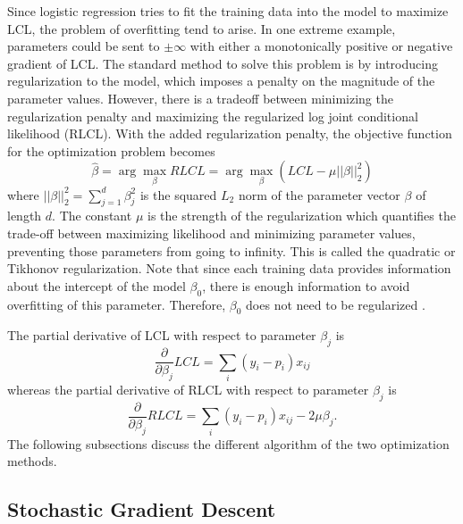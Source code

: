 \documentclass{article} %
\newcommand{\argmax}{\arg\!\max}
\begin{document}
Since logistic regression tries to fit the training data into the model to maximize LCL, the problem of overfitting tend to arise.
In one extreme example, parameters could be sent to $\pm \infty$ with either a monotonically positive or negative gradient of LCL\@.
The standard method to solve this problem is by introducing regularization to the model, which imposes a penalty on the magnitude of the parameter values.
However, there is a tradeoff between minimizing the regularization penalty and maximizing the regularized log joint conditional likelihood (RLCL).
With the added regularization penalty, the objective function for the optimization problem becomes
\begin{equation} \label{eq:objfun_reg}
\hat{\beta} = \argmax_{\beta} RLCL = \argmax_{\beta} (LCL - \mu ||\beta||_2^2)
\end{equation}
where $||\beta||_2^2 = \sum_{j=1}^{d} \beta_j^2$ is the squared $L_2$ norm of the parameter vector $\beta$ of length $d$. The constant $\mu$ is the strength of the regularization which quantifies the trade-off between maximizing likelihood and minimizing parameter values, preventing those parameters from going to infinity. This is called the quadratic or Tikhonov regularization. Note that since each training data provides information about the intercept of the model $\beta_0$, there is enough information to avoid overfitting of this parameter. Therefore, $\beta_0$ does not need to be regularized \cite{elkan}.

The partial derivative of LCL with respect to parameter $\beta_j$ is
\begin{equation} \label{eq:d_LCL}
\frac{\partial}{\partial \beta_j} LCL = \sum_i(y_i-p_i)x_{ij}
\end{equation}
whereas the partial derivative of RLCL with respect to parameter $\beta_j$ is
\begin{equation} \label{eq:d_RLCL}
\frac{\partial}{\partial \beta_j} RLCL = \sum_i(y_i-p_i)x_{ij} - 2 \mu \beta_j.
\end{equation}
The following subsections discuss the different algorithm of the two optimization methods.


\subsection{Stochastic Gradient Descent}
\end{document}
